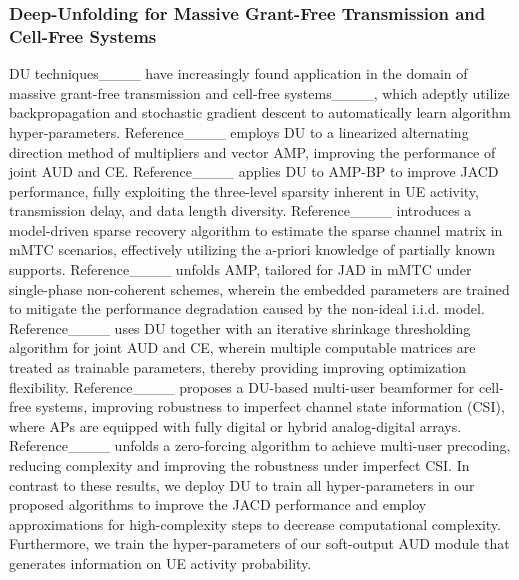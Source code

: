\subsubsection{Deep-Unfolding for  Massive Grant-Free Transmission and Cell-Free Systems}
%
DU techniques____ have increasingly found application in the domain of massive grant-free transmission and cell-free systems____, which adeptly utilize backpropagation and stochastic gradient descent to automatically learn algorithm hyper-parameters. 
%
Reference____ employs DU to a linearized alternating direction method of multipliers and vector AMP, improving the performance of joint AUD and CE.
%
Reference____ applies DU to AMP-BP to improve JACD performance, fully exploiting the three-level sparsity inherent in UE activity, transmission delay, and data length diversity.
%
Reference____ introduces a model-driven sparse recovery algorithm to estimate the sparse channel matrix in mMTC scenarios, effectively utilizing the a-priori knowledge of partially known supports.
%
Reference____ unfolds AMP, tailored for JAD in mMTC under single-phase non-coherent schemes, wherein the embedded parameters are trained to mitigate the performance degradation caused by the non-ideal i.i.d. model.
%
Reference____ uses DU together with an iterative shrinkage thresholding algorithm for joint AUD and CE, wherein multiple computable matrices are treated as trainable parameters, thereby providing improving optimization flexibility.
%
Reference____ proposes a DU-based multi-user beamformer for cell-free systems, improving robustness to imperfect channel state information (CSI), where APs are equipped with fully digital or hybrid analog-digital arrays.
%
Reference____ unfolds a zero-forcing algorithm to achieve multi-user precoding, reducing complexity and improving the robustness under imperfect CSI.
%
In contrast to these results, we deploy DU to train all hyper-parameters in our proposed algorithms to improve the JACD performance and employ approximations for high-complexity steps to decrease computational complexity.
%
Furthermore, we train the hyper-parameters of our soft-output AUD module that generates information on UE activity probability.